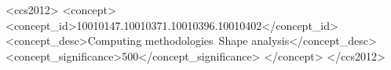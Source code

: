 \documentclass[tog]{acmsiggraph}
\begin{document}



\begin{CCSXML}
<ccs2012>
<concept>
<concept_id>10010147.10010371.10010396.10010402</concept_id>
<concept_desc>Computing methodologies~Shape analysis</concept_desc>
<concept_significance>500</concept_significance>
</concept>
</ccs2012>
\end{CCSXML}


\keywordlist

\conceptlist

\printcopyright











\end{document}
